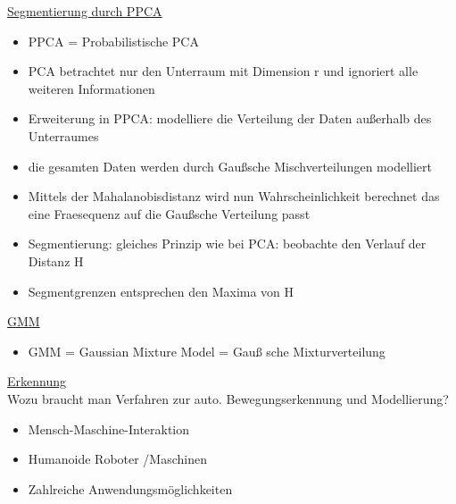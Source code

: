 \documentclass[a4paper,10pt,oneside]{article}
\begin{document}
\underline{Segmentierung durch PPCA} \\ 		
 	\begin{itemize}
 		\item PPCA = Probabilistische PCA
 		\item PCA betrachtet nur den Unterraum mit Dimension r und ignoriert alle weiteren Informationen
 		\item Erweiterung in PPCA: modelliere die Verteilung der Daten außerhalb des Unterraumes
 		\item die gesamten Daten werden durch Gaußsche Mischverteilungen modelliert
 		\item Mittels der Mahalanobisdistanz wird nun Wahrscheinlichkeit berechnet das eine Fraesequenz auf die Gaußsche Verteilung passt
 		\item Segmentierung: gleiches Prinzip wie bei PCA: beobachte den Verlauf der Distanz H
 		\item Segmentgrenzen entsprechen den Maxima von H
 	\end{itemize}

\underline{GMM} \\
	\begin{itemize}
		\item GMM = Gaussian Mixture Model = Gauß sche Mixturverteilung
	\end{itemize}
 		
 		
\underline{Erkennung} \\
Wozu braucht man Verfahren zur auto. Bewegungserkennung und Modellierung?
	\begin{itemize}
		\item Mensch-Maschine-Interaktion
		\item Humanoide Roboter /Maschinen 
		\item Zahlreiche Anwendungsmöglichkeiten
	\end{itemize}	 	
	
\end{document}
